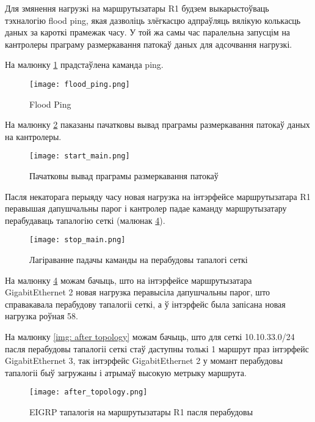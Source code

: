 Для змянення нагрузкі на маршрутызатары R1 будзем выкарыстоўваць тэхналогію flood ping,
якая дазволіць злёгкасцю адпраўляць вялікую колькасць даных за кароткі прамежак часу.
У той жа самы час паралельна запусцім на кантролеры праграму размеркавання патокаў даных для адсочвання нагрузкі.

На малюнку \ref{img: flood ping} прадстаўлена каманда ping.

\clearpage

\begin{figure}[h!]
    \centering
    \texttt{[image: flood\_ping.png]}
    \caption{Flood Ping}
    \label{img: flood ping} 
\end{figure}

На малюнку \ref{img: start main} паказаны пачатковы вывад праграмы размеркавання патокаў даных на кантролеры.

\begin{figure}[h!]
    \centering
    \texttt{[image: start\_main.png]}
    \caption{Пачатковы вывад праграмы размеркавання патокаў}
    \label{img: start main} 
\end{figure}

Пасля некаторага перыяду часу новая нагрузка на інтэрфейсе маршрутызатара R1 перавышая дапушчальны парог і кантролер падае каманду маршрутызатару перабудаваць тапалогію сеткі (малюнак \ref{img: stop main}). 

\begin{figure}[h!]
    \centering
    \texttt{[image: stop\_main.png]}
    \caption{Лагіраванне падачы каманды на перабудовы тапалогі сеткі}
    \label{img: stop main} 
\end{figure}

На малюнку \ref{img: stop main} можам бачыць, што на інтэрфейсе маршрутызатара GigabitEthernet 2 новая нагрузка перавысіла дапушчальны парог, што справакавала перабудову тапалогіі сеткі, а ў інтэрфейс была
запісана новая нагрузка роўная 58.

На малюнку \ref{img: after topology} можам бачыць, што для сеткі 10.10.33.0/24 пасля перабудовы тапалогіі сеткі стаў даступны толькі 1 маршрут праз інтэрфейс GigabitEthernet 3, так інтэрфейс GigabitEthernet 2 у момант перабудовы тапалогіі быў загружаны і атрымаў высокую метрыку маршрута.

\begin{figure}[h!]
    \centering
    \texttt{[image: after\_topology.png]}
    \caption{EIGRP тапалогія на маршрутызатары R1 пасля перабудовы}
    \label{img: stop main} 
\end{figure}


